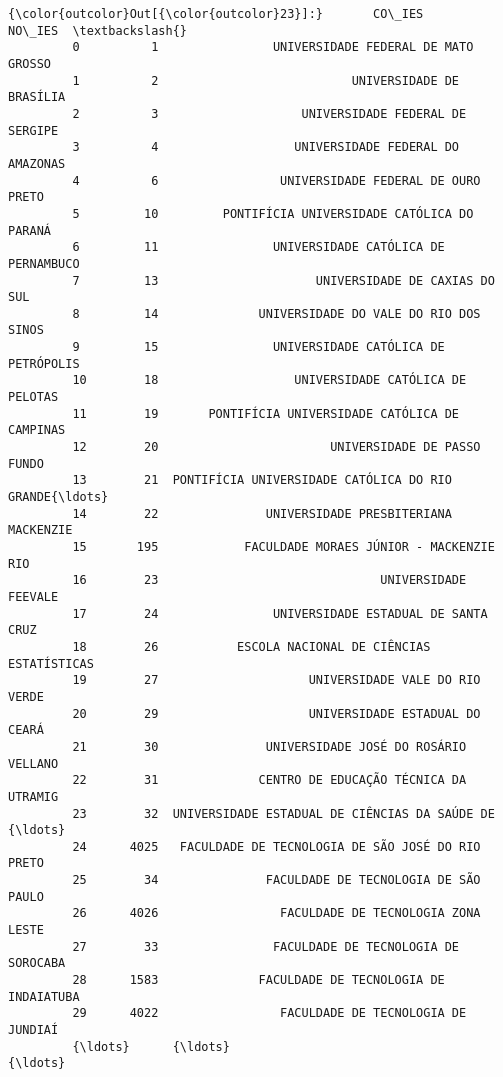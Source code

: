 \documentclass[11pt]{article}
\begin{document}
\begin{Verbatim}[commandchars=\\\{\}]
{\color{outcolor}Out[{\color{outcolor}23}]:}       CO\_IES                                             NO\_IES  \textbackslash{}
         0          1                UNIVERSIDADE FEDERAL DE MATO GROSSO   
         1          2                           UNIVERSIDADE DE BRASÍLIA   
         2          3                    UNIVERSIDADE FEDERAL DE SERGIPE   
         3          4                   UNIVERSIDADE FEDERAL DO AMAZONAS   
         4          6                 UNIVERSIDADE FEDERAL DE OURO PRETO   
         5         10         PONTIFÍCIA UNIVERSIDADE CATÓLICA DO PARANÁ   
         6         11                UNIVERSIDADE CATÓLICA DE PERNAMBUCO   
         7         13                      UNIVERSIDADE DE CAXIAS DO SUL   
         8         14              UNIVERSIDADE DO VALE DO RIO DOS SINOS   
         9         15                UNIVERSIDADE CATÓLICA DE PETRÓPOLIS   
         10        18                   UNIVERSIDADE CATÓLICA DE PELOTAS   
         11        19       PONTIFÍCIA UNIVERSIDADE CATÓLICA DE CAMPINAS   
         12        20                        UNIVERSIDADE DE PASSO FUNDO   
         13        21  PONTIFÍCIA UNIVERSIDADE CATÓLICA DO RIO GRANDE{\ldots}   
         14        22               UNIVERSIDADE PRESBITERIANA MACKENZIE   
         15       195            FACULDADE MORAES JÚNIOR - MACKENZIE RIO   
         16        23                               UNIVERSIDADE FEEVALE   
         17        24                UNIVERSIDADE ESTADUAL DE SANTA CRUZ   
         18        26           ESCOLA NACIONAL DE CIÊNCIAS ESTATÍSTICAS   
         19        27                     UNIVERSIDADE VALE DO RIO VERDE   
         20        29                     UNIVERSIDADE ESTADUAL DO CEARÁ   
         21        30               UNIVERSIDADE JOSÉ DO ROSÁRIO VELLANO   
         22        31              CENTRO DE EDUCAÇÃO TÉCNICA DA UTRAMIG   
         23        32  UNIVERSIDADE ESTADUAL DE CIÊNCIAS DA SAÚDE DE {\ldots}   
         24      4025   FACULDADE DE TECNOLOGIA DE SÃO JOSÉ DO RIO PRETO   
         25        34               FACULDADE DE TECNOLOGIA DE SÃO PAULO   
         26      4026                 FACULDADE DE TECNOLOGIA ZONA LESTE   
         27        33                FACULDADE DE TECNOLOGIA DE SOROCABA   
         28      1583              FACULDADE DE TECNOLOGIA DE INDAIATUBA   
         29      4022                 FACULDADE DE TECNOLOGIA DE JUNDIAÍ   
         {\ldots}      {\ldots}                                                {\ldots}   

\end{Verbatim}
\end{document}
